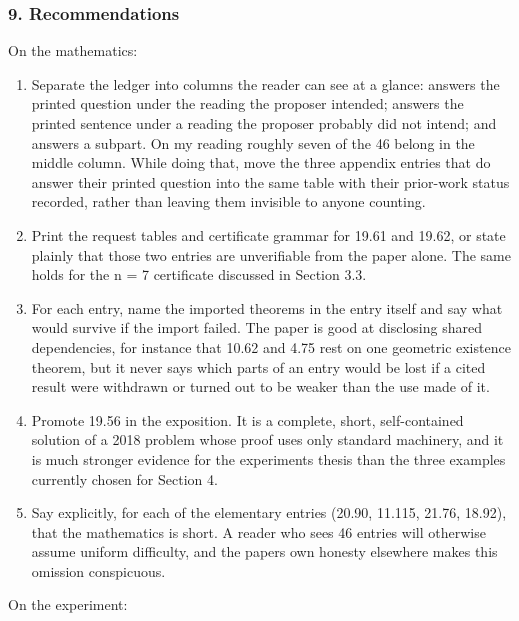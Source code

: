 \hypertarget{review-md-recommendations}{%
\subsubsection*{9. Recommendations}\label{review-md-recommendations}}

On the mathematics:

\begin{enumerate}
\def\labelenumi{\arabic{enumi}.}
\tightlist
\item
  Separate the ledger into columns the reader can see at a glance:
  answers the printed question under the reading the proposer intended;
  answers the printed sentence under a reading the proposer probably did
  not intend; and answers a subpart. On my reading roughly seven of the
  46 belong in the middle column. While doing that, move the three
  appendix entries that do answer their printed question into the same
  table with their prior-work status recorded, rather than leaving them
  invisible to anyone counting.
\item
  Print the request tables and certificate grammar for 19.61 and 19.62,
  or state plainly that those two entries are unverifiable from the
  paper alone. The same holds for the n = 7 certificate discussed in
  Section 3.3.
\item
  For each entry, name the imported theorems in the entry itself and say
  what would survive if the import failed. The paper is good at
  disclosing shared dependencies, for instance that 10.62 and 4.75 rest
  on one geometric existence theorem, but it never says which parts of
  an entry would be lost if a cited result were withdrawn or turned out
  to be weaker than the use made of it.
\item
  Promote 19.56 in the exposition. It is a complete, short,
  self-contained solution of a 2018 problem whose proof uses only
  standard machinery, and it is much stronger evidence for the
  experiment\textquotesingle s thesis than the three examples currently
  chosen for Section 4.
\item
  Say explicitly, for each of the elementary entries (20.90, 11.115,
  21.76, 18.92), that the mathematics is short. A reader who sees 46
  entries will otherwise assume uniform difficulty, and the
  paper\textquotesingle s own honesty elsewhere makes this omission
  conspicuous.
\end{enumerate}

On the experiment:

